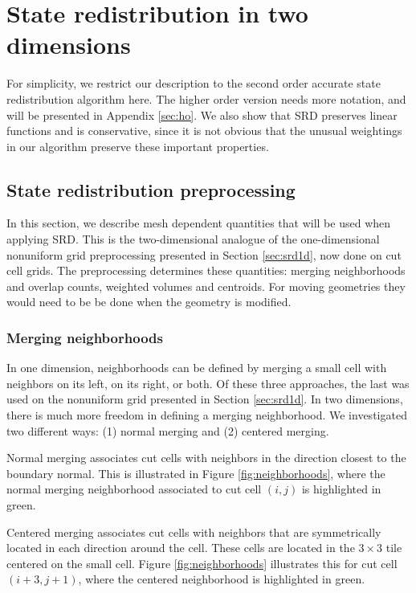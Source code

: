 \section{State redistribution in two dimensions}\label{sec:srdAlg}

For simplicity, we restrict our description to the second order accurate state redistribution
algorithm here. The higher order version needs more notation, and will be presented in 
Appendix \ref{sec:ho}.  
We also show that SRD preserves linear functions and is conservative, since
it is not obvious that the unusual weightings in our algorithm
preserve these important properties.

\subsection{State redistribution preprocessing}\label{sec:preprocessing}


In this section, we describe mesh dependent quantities that will be used when applying 
SRD. This is the two-dimensional analogue of the one-dimensional 
nonuniform grid preprocessing presented in Section \ref{sec:srd1d}, now done on cut cell grids.
The preprocessing determines these quantities: merging neighborhoods and overlap counts, 
weighted volumes and centroids.
For moving geometries they would need to be be done when the geometry is modified.

\subsubsection*{Merging neighborhoods}

In one dimension, neighborhoods can be defined by merging a small cell with neighbors on its left, on its right, or both.  Of these three approaches, the last was used on the nonuniform grid presented in Section \ref{sec:srd1d}.
In two dimensions, there is much more freedom in defining a merging neighborhood.  
We investigated two different ways: (1) normal merging and (2) centered merging.

Normal merging associates cut cells with neighbors in the direction closest to the 
boundary normal.  This is illustrated in Figure \ref{fig:neighborhoods}, where the normal merging neighborhood associated to cut cell $(i,j)$ is highlighted in green.

Centered merging associates cut cells with neighbors that are 
symmetrically located in each direction around the cell.
These cells are located in the $3 \times 3$ tile centered on the small cell.  Figure \ref{fig:neighborhoods}
illustrates this for cut cell $(i+3,j+1)$, where the centered neighborhood is highlighted in green.

